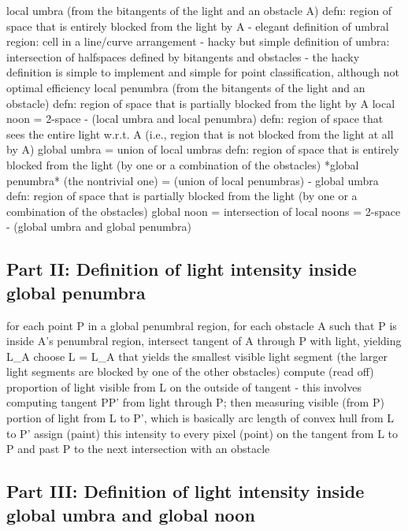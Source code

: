 local umbra 
	(from the bitangents of the light and an obstacle A)
	defn: region of space that is entirely blocked from the light by A
	- elegant definition of umbral region: cell in a line/curve arrangement
	- hacky but simple definition of umbra: intersection of halfspaces defined
		by bitangents and obstacles
	- the hacky definition is simple to implement and simple for point 
		classification, although not optimal efficiency
local penumbra 
	(from the bitangents of the light and an obstacle)
	defn: region of space that is partially blocked from the light by A
local noon
	= 2-space - (local umbra and local penumbra)
	defn: region of space that sees the entire light w.r.t. A
		(i.e., region that is not blocked from the light at all by A)
global umbra 
	= union of local umbras
	defn: region of space that is entirely blocked from the light 
	      (by one or a combination of the obstacles)
*global penumbra*	(the nontrivial one)
	= (union of local penumbras) - global umbra
	defn: region of space that is partially blocked from the light 
	      (by one or a combination of the obstacles)
global noon
	= intersection of local noons
	= 2-space - (global umbra and global penumbra)
	
			
\subsection{Part II: Definition of light intensity inside global penumbra}

for each point P in a global penumbral region,
  for each obstacle A such that P is inside A's penumbral region,
	intersect tangent of A through P with light, yielding L_A
  choose L = L_A that yields the smallest visible light segment
	(the larger light segments are blocked by one of the other obstacles)
  compute (read off) proportion of light visible from L on the
	outside of tangent
	   - this involves computing tangent PP' from light 
	     through P; then measuring visible (from P) portion of 
	     light from L to P', which is basically arc length
	     of convex hull from L to P'
  assign (paint) this intensity to every pixel (point) on 
	     the tangent from L to P and past P to the next 
	     intersection with an obstacle

			
\subsection{Part III: Definition of light intensity inside global umbra and global noon}

